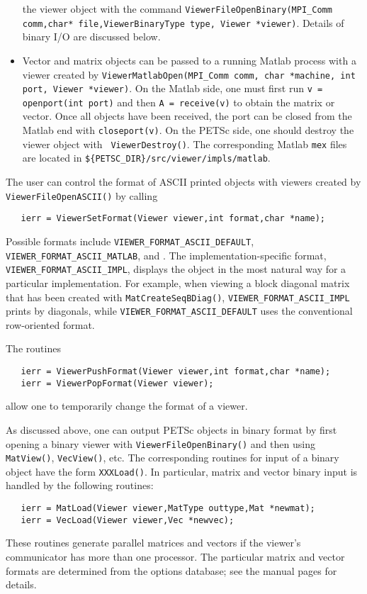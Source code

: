 \begin{itemize}
      the viewer object with the command
      {\tt ViewerFileOpenBinary(MPI\_Comm comm,char* file,ViewerBinaryType type,
      Viewer *viewer)}.   Details of binary
      I/O are discussed below.
\item Vector and matrix objects can be passed to a running Matlab process
      with a viewer created by {\tt ViewerMatlabOpen(MPI\_Comm comm,
      char *machine, int port, Viewer *viewer)}.  
      On the Matlab side, one must first run {\tt v = openport(int port)}
      and then {\tt A = receive(v)} to obtain the matrix or vector. Once all
      objects have been received, the port can be closed from the Matlab end
      with {\tt closeport(v)}. On the PETSc side, one should destroy
      the viewer object with  {\tt
      ViewerDestroy()}. The corresponding Matlab {\tt mex}
      files are located in {\tt \$\{PETSC\_DIR\}/src/viewer/impls/matlab}.
\end{itemize}

The user can control the format of ASCII printed objects with viewers 
created by {\tt ViewerFileOpenASCII()} by calling
\begin{verbatim}
   ierr = ViewerSetFormat(Viewer viewer,int format,char *name);
\end{verbatim}  
  
 
Possible formats include 
{\tt VIEWER\_FORMAT\_ASCII\_DEFAULT}, {\tt VIEWER\_FORMAT\_ASCII\_MATLAB}, and
.  The implementation-specific format, 
{\tt VIEWER\_FORMAT\_ASCII\_IMPL}, displays the object in the most natural way
for a particular implementation.  For example, when viewing a block 
diagonal matrix that has been created with {\tt MatCreateSeqBDiag()},
{\tt VIEWER\_FORMAT\_ASCII\_IMPL} prints by diagonals, while {\tt VIEWER\_FORMAT\_ASCII\_DEFAULT}
uses the conventional row-oriented format.

The routines
\begin{verbatim}
   ierr = ViewerPushFormat(Viewer viewer,int format,char *name);
   ierr = ViewerPopFormat(Viewer viewer);
\end{verbatim} 
allow one to temporarily change the format of a viewer.
 

As discussed above, one can output PETSc objects in binary format by
first opening a binary viewer with {\tt ViewerFileOpenBinary()} and
then using {\tt MatView()}, {\tt VecView()}, etc.  The corresponding
routines for input of a binary object have the form {\tt XXXLoad()}.  In
particular, matrix and vector binary input is handled by the
following routines:  
\begin{verbatim}
   ierr = MatLoad(Viewer viewer,MatType outtype,Mat *newmat);
   ierr = VecLoad(Viewer viewer,Vec *newvec);
\end{verbatim}
These routines generate parallel matrices and vectors if the viewer's
communicator has more than one processor.  The particular matrix and
vector formats are determined from the options database; see the
manual pages for details.

